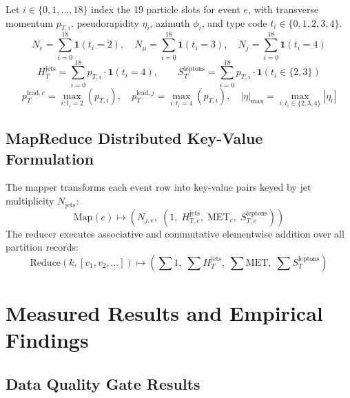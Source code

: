 \documentclass[11pt,a4paper]{article}
\begin{document}
Let $i \in \{0, 1, \dots, 18\}$ index the 19 particle slots for event $e$, with transverse momentum $p_{T, i}$, pseudorapidity $\eta_i$, azimuth $\phi_i$, and type code $t_i \in \{0, 1, 2, 3, 4\}$.
\begin{equation}
N_e = \sum_{i=0}^{18} \mathbf{1}(t_i = 2), \quad
N_\mu = \sum_{i=0}^{18} \mathbf{1}(t_i = 3), \quad
N_j = \sum_{i=0}^{18} \mathbf{1}(t_i = 4)
\end{equation}
\begin{equation}
H_T^{\text{jets}} = \sum_{i=0}^{18} p_{T, i} \cdot \mathbf{1}(t_i = 4), \qquad
S_T^{\text{leptons}} = \sum_{i=0}^{18} p_{T, i} \cdot \mathbf{1}(t_i \in \{2, 3\})
\end{equation}
\begin{equation}
p_T^{\text{lead}, e} = \max_{i: t_i=2} (p_{T, i}), \quad
p_T^{\text{lead}, j} = \max_{i: t_i=4} (p_{T, i}), \quad
|\eta|_{\max} = \max_{i: t_i \in \{2, 3, 4\}} |\eta_i|
\end{equation}

\subsection{MapReduce Distributed Key-Value Formulation}

The mapper transforms each event row into key-value pairs keyed by jet multiplicity $N_{\text{jets}}$:
\begin{equation}
\text{Map}(e) \mapsto \left( N_{j, e}, \; \left( 1, \; H_{T, e}^{\text{jets}}, \; \text{MET}_e, \; S_{T, e}^{\text{leptons}} \right) \right)
\end{equation}
The reducer executes associative and commutative elementwise addition over all partition records:
\begin{equation}
\text{Reduce}(k, [v_1, v_2, \dots]) \mapsto \left( \sum 1, \; \sum H_T^{\text{jets}}, \; \sum \text{MET}, \; \sum S_T^{\text{leptons}} \right)
\end{equation}

\section{Measured Results and Empirical Findings}

\subsection{Data Quality Gate Results}
\end{document}

